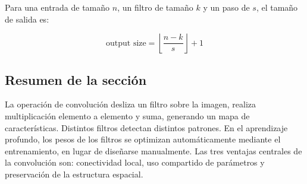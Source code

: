 Para una entrada de tamaño $n$, un filtro de tamaño $k$ y un paso de $s$, el tamaño de salida es:

$$\text{output size} = \left\lfloor \frac{n - k}{s} \right\rfloor + 1$$

\subsection{Resumen de la sección}

La operación de convolución desliza un filtro sobre la imagen, realiza multiplicación elemento a elemento y suma, generando un mapa de características. Distintos filtros detectan distintos patrones. En el aprendizaje profundo, los pesos de los filtros se optimizan automáticamente mediante el entrenamiento, en lugar de diseñarse manualmente. Las tres ventajas centrales de la convolución son: conectividad local, uso compartido de parámetros y preservación de la estructura espacial.

\newpage
